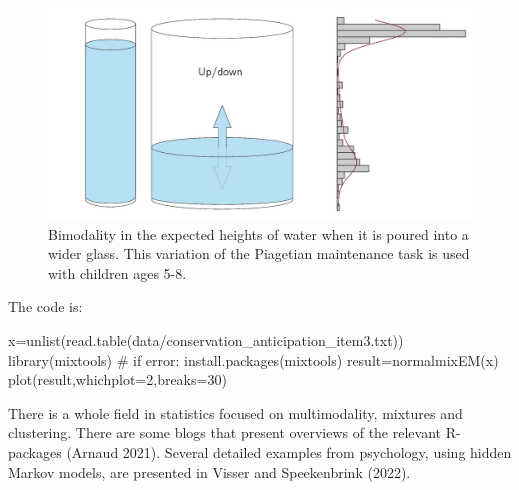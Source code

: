 \documentclass[
  a4paper,
  DIV=11,
  numbers=noendperiod,
  oneside]{scrreprt}
\newenvironment{Shaded}{\begin{snugshade}}{\end{snugshade}}
\newcommand{\AttributeTok}[1]{\textcolor[rgb]{0.40,0.45,0.13}{#1}}
\newcommand{\CommentTok}[1]{\textcolor[rgb]{0.37,0.37,0.37}{#1}}
\newcommand{\DecValTok}[1]{\textcolor[rgb]{0.68,0.00,0.00}{#1}}
\newcommand{\FunctionTok}[1]{\textcolor[rgb]{0.28,0.35,0.67}{#1}}
\newcommand{\NormalTok}[1]{\textcolor[rgb]{0.00,0.23,0.31}{#1}}
\newcommand{\OtherTok}[1]{\textcolor[rgb]{0.00,0.23,0.31}{#1}}
\newcommand{\StringTok}[1]{\textcolor[rgb]{0.13,0.47,0.30}{#1}}
\begin{document}
\begin{figure}

{\centering \includegraphics{media/ch3/fig-ch3-img20-old-32.jpg}

}

\caption{\label{fig-ch3-img20-old-32}Bimodality in the expected heights
of water when it is poured into a wider glass. This variation of the
Piagetian maintenance task is used with children ages 5-8.}

\end{figure}

The code is:

\begin{Shaded}
\begin{Highlighting}[]
\NormalTok{x}\OtherTok{=}\FunctionTok{unlist}\NormalTok{(}\FunctionTok{read.table}\NormalTok{(}\StringTok{\textquotesingle{}data/conservation\_anticipation\_item3.txt\textquotesingle{}}\NormalTok{))}
\FunctionTok{library}\NormalTok{(mixtools) }\CommentTok{\# if error: install.packages(\textquotesingle{}mixtools\textquotesingle{})}
\NormalTok{result}\OtherTok{=}\FunctionTok{normalmixEM}\NormalTok{(x)}
\FunctionTok{plot}\NormalTok{(result,}\AttributeTok{whichplot=}\DecValTok{2}\NormalTok{,}\AttributeTok{breaks=}\DecValTok{30}\NormalTok{)}
\end{Highlighting}
\end{Shaded}

There is a whole field in statistics focused on multimodality, mixtures
and clustering. There are some blogs that present overviews of the
relevant R-packages (Arnaud 2021). Several detailed examples from
psychology, using hidden Markov models, are presented in Visser and
Speekenbrink (2022).
\end{document}
